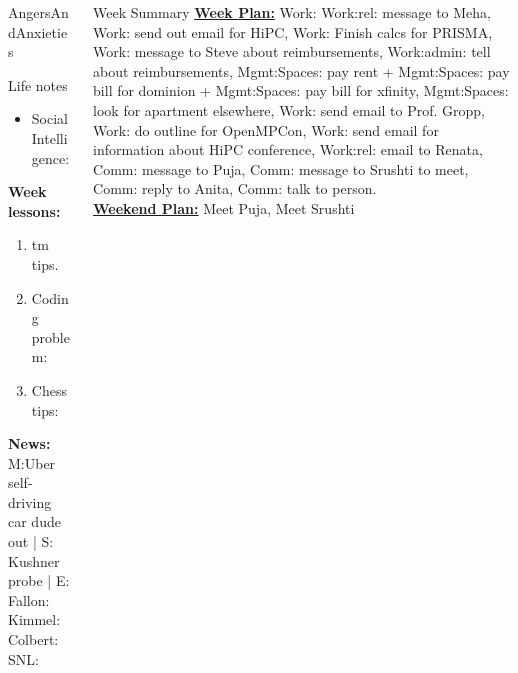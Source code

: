 \begin{columns}
\begin{column}{0.20\linewidth}
\begin{block}{AngersAndAnxieties}
\begin{itemize}
      \end{itemize}
    \end{block}
      \begin{block}{Life notes}
        \begin{itemize}
          \tiny \item \tiny Social Intelligence: 
        \end{itemize}
      \end{block}

      \begin{block}
        {\tiny {\bf Week lessons:}}
        \begin{enumerate}
        \item \tiny tm tips.
        \item \tiny Coding problem: 
        \item \tiny Chess tips: 

        \end{enumerate}
            {{\tiny {\tiny \bf  News:}} {\tiny  M:Uber self-driving
                car dude out | S: Kushner probe | E: Fallon:   Kimmel:  Colbert: SNL:}}
      \end{block}
    \end{column}
  \begin{column}{0.6\linewidth}
    \begin{block}{Week Summary} 
      {\underline {\bf Week Plan:} 
        Work:  Work:rel: message to Meha, Work:
        send out email for HiPC, Work: Finish calcs
        for PRISMA, Work: message to Steve about reimbursements, 
        Work:admin: tell about reimbursements, Mgmt:Spaces: pay
        rent + Mgmt:Spaces: pay bill for dominion + Mgmt:Spaces: pay
        bill for xfinity, Mgmt:Spaces: look for apartment elsewhere,
        Work: send email to Prof. Gropp, Work: do outline for OpenMPCon, Work: send
        email for information about HiPC conference, Work:rel: email
        to Renata, Comm: message to Puja, Comm: message to Srushti to 
        meet, Comm: reply to Anita, Comm: talk to person. } \\
      {\underline{\bf Weekend Plan:} Meet Puja, Meet Srushti }\\
    \end{block}


\end{column}
\end{columns}
